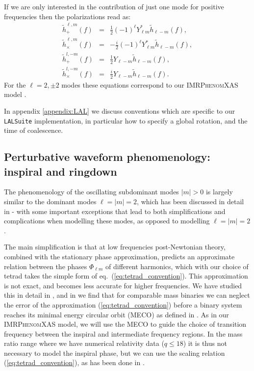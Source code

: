 \documentclass[twocolumn,prd,aps,superscriptaddress,preprintnumbers,tightenlines,showpacs,nofootinbib,eqsecnum,amsfonts,amsmath]{revtex4}
\newcommand{\phX}{\textsc{IMRPhenomXAS}\xspace}
\begin{document}
If we are only interested in the contribution of just one mode for positive frequencies then the polarizations read as:
\begin{eqnarray}\label{def:polarizations_FD2}
    \tilde{h}_{+}^{\ell,m}(f) &=& \frac{1}{2} (-1)^\ell Y_{\ell m}^* \tilde{h}_{\ell-m}(f),\\
    \tilde{h}_{\times}^{\ell,m}(f) &=& -\frac{i}{2} (-1)^\ell Y_{\ell m}^* \tilde{h}_{\ell-m}(f),\\
    \tilde{h}_{+}^{l,-m}(f) &=& \frac{1}{2} Y_{\ell-m} \tilde{h}_{\ell-m}(f),\\
    \tilde{h}_{\times}^{l,-m}(f) &=& \frac{i}{2} Y_{\ell-m} \tilde{h}_{\ell-m}(f).
\end{eqnarray}
For the ${\ell=2, \pm  2}$ modes these equations correspond to our \phX model \cite{phenX}.

In appendix \ref{appendix:LAL} we discuss conventions which are specific to our \texttt{LALSuite} implementation, in particular how to specify a global rotation, and the time of coalescence.

\subsection{Perturbative waveform phenomenology: inspiral and ringdown} \label{sec:prelim_phenomenology}

The phenomenology of the oscillating subdominant modes $\vert m \vert >0$ is largely similar to the dominant modes
$\ell=\vert m \vert  = 2$, which has been discussed in detail in \cite{Husa:2015iqa,phenX} - with some important exceptions that lead to both simplifications and complications when modelling these modes, as opposed to modelling $\ell=\vert m \vert  = 2$.

The main simplification is that at low frequencies post-Newtonian theory, combined with the stationary phase approximation, predicts
an approximate relation between the phases $\Phi_{\ell m}$ of different harmonics, which with our choice of tetrad takes the simple form of eq.~(\ref{eq:tetrad_convention}).
This approximation is not exact, and becomes less accurate for higher frequencies.
We have studied this in detail in \cite{Bustillo:2015ova,hybrids}, and in \cite{hybrids} we find that for comparable mass binaries we can neglect the error of the approximation (\ref{eq:tetrad_convention}) before a binary system reaches its minimal energy circular orbit (MECO) as defined in
\cite{Cabero:2016ayq}. As in our \phX model, we will use the MECO to guide the choice of transition frequency between the inspiral and intermediate frequency regions.
In the mass ratio range where we have numerical relativity data ($q\leq 18$) it is thus not necessary to model the 
inspiral phase, but we can use the scaling relation (\ref{eq:tetrad_convention}), as has been done in \cite{London:2017bcn}.
\end{document}

